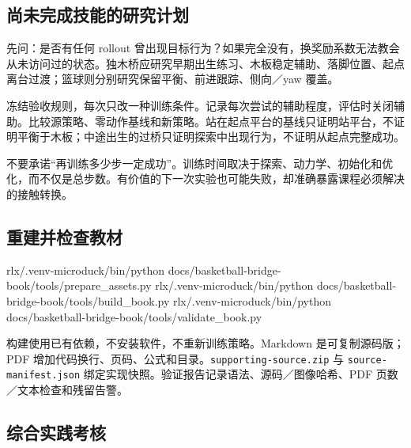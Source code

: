 \documentclass[
  chinese,
  11pt,
  letterpaper,
]{article}
\newenvironment{Shaded}{\begin{snugshade}}{\end{snugshade}}
\newcommand{\ExtensionTok}[1]{#1}
\newcommand{\NormalTok}[1]{#1}
\renewenvironment{Shaded}{\par\smallskip}{\par\smallskip}
\begin{document}
\subsection{尚未完成技能的研究计划}\label{ux5c1aux672aux5b8cux6210ux6280ux80fdux7684ux7814ux7a76ux8ba1ux5212}

先问：是否有任何 rollout
曾出现目标行为？如果完全没有，换奖励系数无法教会从未访问过的状态。独木桥应研究早期出生练习、木板稳定辅助、落脚位置、起点离台过渡；篮球则分别研究保留平衡、前进跟踪、侧向／yaw
覆盖。

冻结验收规则，每次只改一种训练条件。记录每次尝试的辅助程度，评估时关闭辅助。比较源策略、零动作基线和新策略。站在起点平台的基线只证明站平台，不证明平衡于木板；中途出生的过桥只证明探索中出现行为，不证明从起点完整成功。

不要承诺``再训练多少步一定成功''。训练时间取决于探索、动力学、初始化和优化，而不仅是总步数。有价值的下一次实验也可能失败，却准确暴露课程必须解决的接触转换。

\subsection{重建并检查教材}\label{ux91cdux5efaux5e76ux68c0ux67e5ux6559ux6750}

\begin{Shaded}
\begin{Highlighting}[]
\ExtensionTok{rlx/.venv{-}microduck/bin/python}\NormalTok{ docs/basketball{-}bridge{-}book/tools/prepare\_assets.py}
\ExtensionTok{rlx/.venv{-}microduck/bin/python}\NormalTok{ docs/basketball{-}bridge{-}book/tools/build\_book.py}
\ExtensionTok{rlx/.venv{-}microduck/bin/python}\NormalTok{ docs/basketball{-}bridge{-}book/tools/validate\_book.py}
\end{Highlighting}
\end{Shaded}

构建使用已有依赖，不安装软件，不重新训练策略。Markdown
是可复制源码版；PDF
增加代码换行、页码、公式和目录。\texttt{supporti\allowbreak{}ng-\allowbreak{}source.z\allowbreak{}ip}
与 \texttt{source-\allowbreak{}manifest\allowbreak{}.json}
绑定实现快照。验证报告记录语法、源码／图像哈希、PDF
页数／文本检查和残留告警。

\subsection{综合实践考核}\label{ux7efcux5408ux5b9eux8df5ux8003ux6838}
\end{document}
